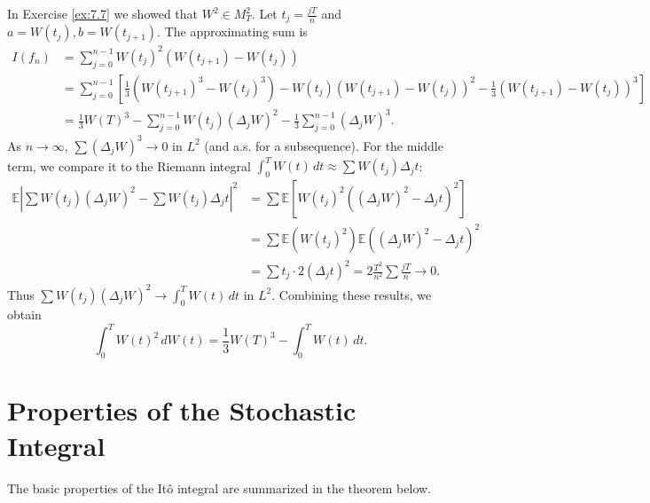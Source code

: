 \begin{Solution}
In Exercise \ref{ex:7.7} we showed that $W^2 \in M_T^2$. Let $t_j = \frac{jT}{n}$ and $a = W(t_j), b = W(t_{j+1})$. The approximating sum is
\begin{align*}
I(f_n) &= \sum_{j=0}^{n-1} W(t_j)^2 (W(t_{j+1}) - W(t_j)) \\
&= \sum_{j=0}^{n-1} \left[ \frac{1}{3}(W(t_{j+1})^3 - W(t_j)^3) - W(t_j)(W(t_{j+1}) - W(t_j))^2 - \frac{1}{3}(W(t_{j+1}) - W(t_j))^3 \right] \\
&= \frac{1}{3} W(T)^3 - \sum_{j=0}^{n-1} W(t_j) (\Delta_j W)^2 - \frac{1}{3} \sum_{j=0}^{n-1} (\Delta_j W)^3.
\end{align*}
As $n \to \infty$, $\sum (\Delta_j W)^3 \to 0$ in $L^2$ (and a.s. for a subsequence). For the middle term, we compare it to the Riemann integral $\int_0^T W(t) \, dt \approx \sum W(t_j) \Delta_j t$:
\begin{align*}
\mathbb{E} \left| \sum W(t_j) (\Delta_j W)^2 - \sum W(t_j) \Delta_j t \right|^2 &= \sum \mathbb{E} [ W(t_j)^2 ((\Delta_j W)^2 - \Delta_j t)^2 ] \\
&= \sum \mathbb{E}(W(t_j)^2) \mathbb{E}((\Delta_j W)^2 - \Delta_j t)^2 \\
&= \sum t_j \cdot 2 (\Delta_j t)^2 = 2 \frac{T^2}{n^2} \sum \frac{jT}{n} \to 0.
\end{align*}
Thus $\sum W(t_j) (\Delta_j W)^2 \to \int_0^T W(t) \, dt$ in $L^2$. Combining these results, we obtain
\begin{equation*}
\int_0^T W(t)^2 \, dW(t) = \frac{1}{3} W(T)^3 - \int_0^T W(t) \, dt.
\end{equation*}
\end{Solution}

\section{Properties of the Stochastic Integral}
\label{sec:StochasticIntegralProperties}

The basic properties of the Itô integral are summarized in the theorem below.

